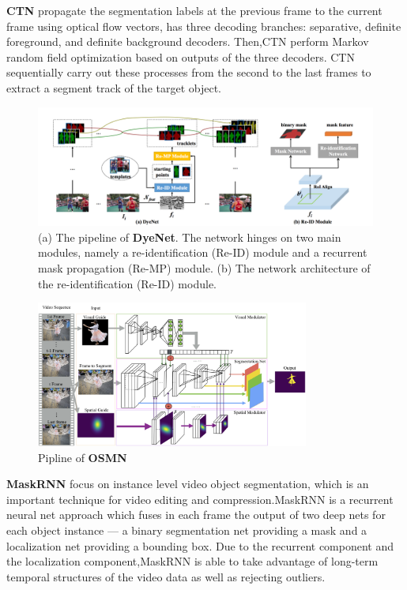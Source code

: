 \textbf{CTN}\cite{CTN} propagate the segmentation labels at the previous frame to the current frame using optical ﬂow vectors, has three decoding branches: separative, definite foreground, and definite background decoders. Then,CTN perform Markov random field optimization based on outputs of the three decoders. CTN sequentially carry out these processes from the second to the last frames to extract a segment track of the target object. 

\begin{figure}[ht]
    \centering
    \includegraphics[width=\textwidth]{./figure/DyeNet.png}
    \caption{(a) The pipeline of \textbf{DyeNet}. The network hinges on two main modules, namely a re-identification (Re-ID) module and a recurrent mask propagation (Re-MP) module. (b) The network architecture of the re-identification (Re-ID) module.}
    \label{DyeNet}
\end{figure}

\begin{figure}[ht]
    \centering
    \includegraphics[width=0.8\textwidth]{./figure/OSMN.png}
    \caption{Pipline of \textbf{OSMN}}
    \label{OSMN}
\end{figure}

\textbf{MaskRNN}\cite{MaskRNN} focus on instance level video object segmentation, which is an important technique for video editing and compression.MaskRNN is a recurrent neural net approach which fuses in each frame the output of two deep nets for each object instance — a binary segmentation net providing a mask and a localization net providing a bounding box. Due to the recurrent component and the localization component,MaskRNN is able to take advantage of long-term temporal structures of the video data as well as rejecting outliers.

